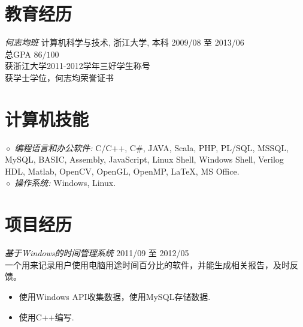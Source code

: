\documentclass[line,margin]{res}
\begin{document}
\address{联系电话:\sl 15216861267}
\address{E-mail:\sl me@daoyuan.wang}


\begin{resume}



\section{教育经历} {\sl 何志均班} 计算机科学与技术, 浙江大学, 本科 \hfill 2009/08 至 2013/06\\
                总GPA $86/100$\\
                获浙江大学2011-2012学年三好学生称号\\
                获学士学位，何志均荣誉证书\\

\section{计算机技能} {$\diamond$ \sl 编程语言和办公软件:} C/C++, C\#, JAVA, Scala, PHP, PL/SQL, MSSQL, MySQL, BASIC, Assembly, JavaScript, Linux Shell, Windows Shell, Verilog HDL, Matlab, OpenCV, OpenGL, OpenMP, \LaTeX, MS Office. \\
                {$\diamond$ \sl 操作系统:} Windows, Linux.

\section{项目经历} {\sl 基于Windows的时间管理系统} \hfill 2011/09 至 2012/05 \\
                一个用来记录用户使用电脑用途时间百分比的软件，并能生成相关报告，及时反馈。
                 \begin{itemize}  \itemsep -2pt %
                 \item 使用Windows API收集数据，使用MySQL存储数据.
                 \item 使用C++编写.
                 \end{itemize}


\end{resume}
\end{document}
